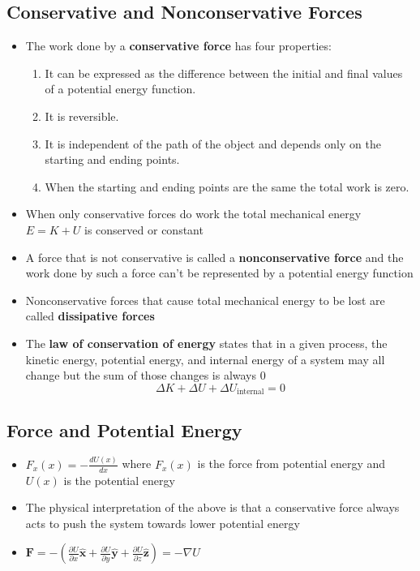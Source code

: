 \documentclass{article}
\begin{document}
\subsection{Conservative and Nonconservative Forces}

\begin{itemize}
\item The work done by a \textbf{conservative force} has four properties:

\begin{enumerate}
    \item It can be expressed as the difference between the initial and final values of a potential energy function.

    \item It is reversible.

    \item It is independent of the path of the object and depends only on the starting and ending points.

    \item When the starting and ending points are the same the total work is zero.
\end{enumerate}

\item When only conservative forces do work the total mechanical energy $E=K+U$ is conserved or constant

\item A force that is not conservative is called a \textbf{nonconservative force} and the work done by such a force can't be represented by a potential energy function

\item Nonconservative forces that cause total mechanical energy to be lost are called \textbf{dissipative forces}

\item The \textbf{law of conservation of energy} states that in a given process, the kinetic energy, potential energy, and internal energy of a system may all change but the sum of those changes is always 0 \[\Delta K + \Delta U + \Delta U_\textrm{internal} = 0\]
\end {itemize}

\subsection{Force and Potential Energy}

\begin{itemize}
    \item $F_x(x)=-\frac{dU(x)}{dx}$ where $F_x(x)$ is the force from potential energy and $U(x)$ is the potential energy

    \item The physical interpretation of the above is that a conservative force always acts to push the system towards lower potential energy

    \item $\textbf{F} = -\left(\frac{\partial U}{\partial x} \hat{\mathbf{x}} + \frac{\partial U}{\partial y} \hat{\mathbf{y}} + \frac{\partial U}{\partial z} \hat{\mathbf{z}}\right)= -\nabla U$
\end{itemize}
\end{document}

